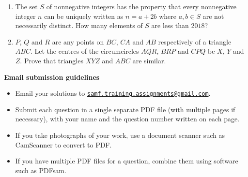 \documentclass{article}
\begin{document}
\begin{enumerate}[1.]
\item %
The set $S$ of nonnegative integers has the property that every nonnegative integer $n$ can be uniquely written as $n = a+2b$ where $a,b \in S$ are not necessarily distinct. How many elements of $S$ are less than $2018$?


\item %
$P$, $Q$ and $R$ are any points on $BC$, $CA$ and $AB$ respectively of a triangle $ABC$. Let the centres of the circumcircles $AQR$, $BRP$ and $CPQ$ be $X$, $Y$ and $Z$. Prove that triangles $XYZ$ and $ABC$ are similar.


\end{enumerate}


\vfill
\textbf{\Large Email submission guidelines}
\begin{itemize}
	\item Email your solutions to \href{mailto:samf.training.assignments@gmail.com}{\texttt{samf.training.assignments@gmail.com}}.
	\item Submit each question in a single separate PDF file (with multiple pages if necessary), with your name and the question number written on each page.
	\item If you take photographs of your work, use a document scanner such as CamScanner to convert to PDF.
	\item If you have multiple PDF files for a question, combine them using software such as PDFsam.
\end{itemize}
\end{document}
